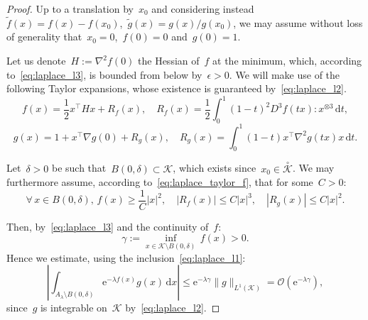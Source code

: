 \documentclass[10pt]{article}
\renewcommand{\d}{\mathrm{d}}
\newcommand{\e}{\mathrm{e}}
\newcommand{\1}{\mathbbm 1}
\renewcommand{\O}{\mathcal{O}}
\begin{document}
        \begin{proof}
            Up to a translation by~$x_0$ and considering instead~$\tilde f(x)=f(x)-f(x_0)$,~$\tilde g(x)=g(x)/g(x_0)$, we may assume without loss of generality that~$x_0=0$,~$f(0) = 0$ and~$g(0)=1$.

            Let us denote~$H := \nabla^2 f(0)$ the Hessian of~$f$ at the minimum, which, according to~\eqref{eq:laplace_l3}, is bounded from below by~$\epsilon>0$.
            We will make use of the following Taylor expansions, whose existence is guaranteed by~\eqref{eq:laplace_l2}.
            \begin{equation}
                \label{eq:laplace_taylor_f}
                f(x) = \frac12 x^\intercal H x + R_f(x),\quad R_f(x) = \frac12\int_0^1 (1-t)^2 D^3 f(tx):x^{\otimes 3} \,\d t,
            \end{equation}
            \begin{equation}
                \label{eq:laplace_taylor_g}
                g(x) = 1 + x^\intercal \nabla g(0) + R_g(x),\quad R_g(x)=\int_0^1 (1-t) x^\intercal \nabla^2 g(tx)x\,\d t.
            \end{equation}


            Let~$\delta>0$ be such that~$B(0,\delta) \subset \mathcal K$, which exists since~$x_0\in\overset{\circ}{\mathcal K}$. We may furthermore assume, according to~\eqref{eq:laplace_taylor_f}, that for some~$C>0$:
            \begin{equation}
                \label{eq:laplace_f_minorization}
                \forall\,x\in B(0,\delta),\, f(x) \geq \frac1C |x|^2,\quad |R_f(x)| \leq C|x|^3,\quad |R_g(x)| \leq C|x|^2.
            \end{equation}
            
            Then, by~\eqref{eq:laplace_l3} and the continuity of~$f$:
            \begin{equation}
                \gamma := \underset{x\in \mathcal K\setminus B(0,\delta)}{\inf}\, f(x) > 0.
            \end{equation}
            Hence we estimate, using the inclusion~\eqref{eq:laplace_l1}:
            \begin{equation}
                \left|\int_{A_\lambda \setminus B(0,\delta)} \e^{-\lambda f(x)}g(x)\,\d x\right| \leq \e^{-\lambda \gamma} \|g\|_{L^1(\mathcal K)} = \O(\e^{-\lambda\gamma}),
            \end{equation}
            since~$g$ is integrable on~$\mathcal K$ by~\eqref{eq:laplace_l2}.


\end{proof}
\end{document}
